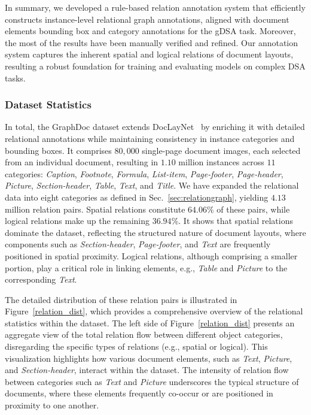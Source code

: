 In summary, we developed a rule-based relation annotation system that efficiently constructs instance-level relational graph annotations, aligned with document elements bounding box and category annotations for the gDSA task. Moreover, the most of the results have been manually verified and refined. Our annotation system captures the inherent spatial and logical relations of document layouts, resulting a robust foundation for training and evaluating models on complex DSA tasks.

\subsubsection{Dataset Statistics}
In total, the GraphDoc dataset extends DocLayNet~\citep{doclaynet2022} by enriching it with detailed relational annotations while maintaining consistency in instance categories and bounding boxes. It comprises $80,000$ single-page document images, each selected from an individual document, resulting in $1.10$ million instances across $11$ categories: \textit{Caption}, \textit{Footnote}, \textit{Formula}, \textit{List-item}, \textit{Page-footer}, \textit{Page-header}, \textit{Picture}, \textit{Section-header}, \textit{Table}, \textit{Text}, and \textit{Title}. We have expanded the relational data into eight categories as defined in Sec.~\ref{sec:relationgraph}, yielding $4.13$ million relation pairs. Spatial relations constitute $64.06\%$ of these pairs, while logical relations make up the remaining $36.94\%$. It shows that spatial relations dominate the dataset, reflecting the structured nature of document layouts, where components such as \textit{Section-header}, \textit{Page-footer}, and \textit{Text} are frequently positioned in spatial proximity. Logical relations, although comprising a smaller portion, play a critical role in linking elements, e.g., \textit{Table} and \textit{Picture} to the corresponding \textit{Text}. 



The detailed distribution of these relation pairs is illustrated in Figure~\ref{relation_dist}, which provides a comprehensive overview of the relational statistics within the dataset. The left side of Figure~\ref{relation_dist} presents an aggregate view of the total relation flow between different object categories, disregarding the specific types of relations (e.g., spatial or logical). This visualization highlights how various document elements, such as \textit{Text}, \textit{Picture}, and \textit{Section-header}, interact within the dataset. The intensity of relation flow between categories such as \textit{Text} and \textit{Picture} underscores the typical structure of documents, where these elements frequently co-occur or are positioned in proximity to one another.

